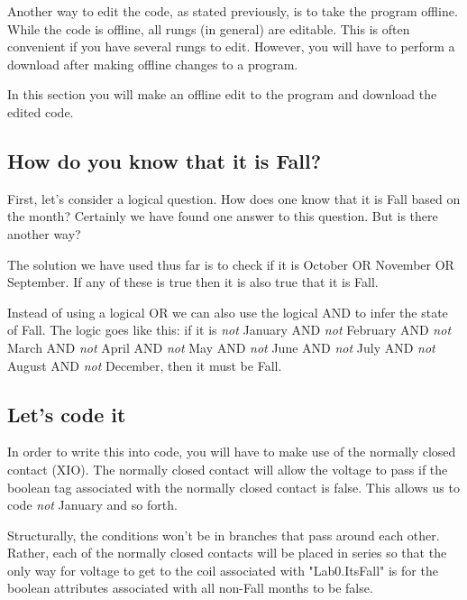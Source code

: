 Another way to edit the code, as stated previously, is to take the program offline. While the code is offline, all rungs (in general) are editable. This is often convenient if you have several rungs to edit. However, you will have to perform a download after making offline changes to a program.

In this section you will make an offline edit to the program and download the edited code.

\subsection{How do you know that it is Fall?}

First, let's consider a logical question. How does one know that it is Fall based on the month? Certainly we have found one answer to this question. But is there another way? 

The solution we have used thus far is to check if it is October OR November OR September. If any of these is true then it is also true that it is Fall.

Instead of using a logical OR we can also use the logical AND to infer the state of Fall. The logic goes like this: if it is \textit{not} January AND \textit{not} February AND \textit{not} March AND \textit{not} April AND \textit{not} May AND \textit{not} June AND \textit{not} July AND \textit{not} August AND \textit{not} December, then it must be Fall. 

\subsection{Let's code it}

In order to write this into code, you will have to make use of the normally closed contact (XIO). The normally closed contact will allow the voltage to pass if the boolean tag associated with the normally closed contact is false. This allows us to code \textit{not} January and so forth.

Structurally, the conditions won't be in branches that pass around each other. Rather, each of the normally closed contacts will be placed in series so that the only way for voltage to get to the coil associated with "Lab0.Its\textunderscore Fall" is for the boolean attributes associated with all non-Fall months to be false.


